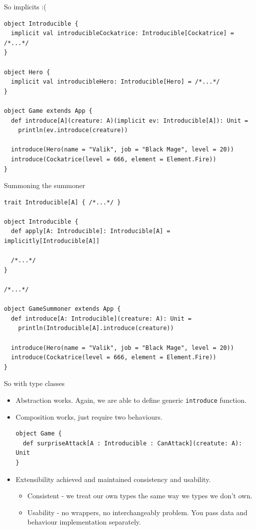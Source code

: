 \documentclass[presentation,aspectratio=169,smaller]{beamer}
\begin{document}
\begin{frame}[label={sec:orgb53468c},fragile]{So implicits :(}
 \begin{verbatim}
object Introducible {
  implicit val introducibleCockatrice: Introducible[Cockatrice] = /*...*/
}

object Hero {
  implicit val introducibleHero: Introducible[Hero] = /*...*/
}

object Game extends App {
  def introduce[A](creature: A)(implicit ev: Introducible[A]): Unit =
    println(ev.introduce(creature))

  introduce(Hero(name = "Valik", job = "Black Mage", level = 20))
  introduce(Cockatrice(level = 666, element = Element.Fire))
}
\end{verbatim}
\end{frame}

\begin{frame}[label={sec:org136ced0},fragile]{Summoning the summoner}
 \begin{verbatim}
trait Introducible[A] { /*...*/ }

object Introducible {
  def apply[A: Introducible]: Introducible[A] = implicitly[Introducible[A]]

  /*...*/
}

/*...*/

object GameSummoner extends App {
  def introduce[A: Introducible](creature: A): Unit =
    println(Introducible[A].introduce(creature))

  introduce(Hero(name = "Valik", job = "Black Mage", level = 20))
  introduce(Cockatrice(level = 666, element = Element.Fire))
}
\end{verbatim}
\end{frame}

\begin{frame}[label={sec:orgc150a87},fragile]{So with type classes}
 \begin{itemize}
\item Abstraction works. Again, we are able to define generic \texttt{introduce} function.
\item Composition works, just require two behaviours.
\begin{verbatim}
object Game {
  def surpriseAttack[A : Introducible : CanAttack](creatute: A): Unit
}
\end{verbatim}
\item Extensibility achieved and maintained consistency and usability.
\begin{itemize}
\item Consistent - we treat our own types the same way we types we don't own.
\item Usability - no wrappers, no interchangeably problem. You pass data and
behaviour implementation separately.
\end{itemize}
\end{itemize}
\end{frame}
\end{document}
